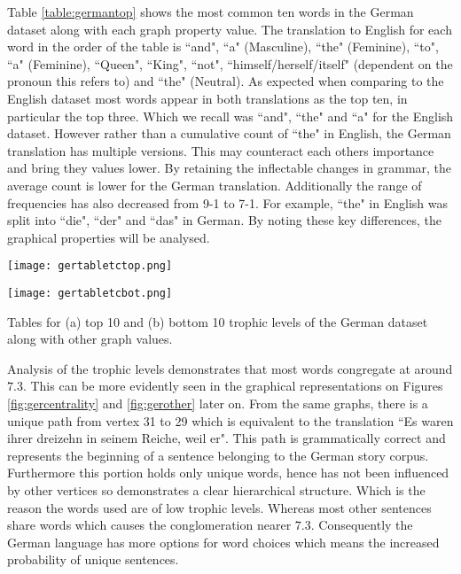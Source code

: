Table \ref{table:germantop} shows the most common ten words in the German dataset along with each graph property value. The translation to English for each word in the order of the table is ``and", ``a" (Masculine), ``the" (Feminine), ``to", ``a" (Feminine), ``Queen", ``King", ``not", ``himself/herself/itself" (dependent on the pronoun this refers to) and ``the" (Neutral). As expected when comparing to the English dataset most words appear in both translations as the top ten, in particular the top three. Which we recall was ``and", ``the" and ``a" for the English dataset. However rather than a cumulative count of ``the" in English, the German translation has multiple versions. This may counteract each others importance and bring they values lower. By retaining the inflectable changes in grammar, the average count is lower for the German translation. Additionally the range of frequencies has also decreased from 9-1 to 7-1. For example, ``the" in English was split into ``die", ``der" and ``das" in German. By noting these key differences, the graphical properties will be analysed.

\begin{table}[H]
\centering
\begin{subtable}{.45\textwidth}
	\centering
	\texttt{[image: gertabletctop.png]}
	\caption{}
	\label{table:germantoptc}
\end{subtable}
\hfill
\begin{subtable}{.45\textwidth}
	\centering
	\texttt{[image: gertabletcbot.png]}
	\caption{}
	\label{table:germanbottc}
\end{subtable}
\caption{Tables for (a) top 10 and (b) bottom 10 trophic levels of the German dataset along with other graph values.}
\end{table}

Analysis of the trophic levels demonstrates that most words congregate at around $7.3$. This can be more evidently seen in the graphical representations on Figures \ref{fig:gercentrality} and \ref{fig:gerother} later on. From the same graphs, there is a unique path from vertex 31 to 29 which is equivalent to the translation ``Es waren ihrer dreizehn in seinem Reiche, weil er". This path is grammatically correct and represents the beginning of a sentence belonging to the German story corpus. Furthermore this portion holds only unique words, hence has not been influenced by other vertices so demonstrates a clear hierarchical structure. Which is the reason the words used are of low trophic levels. Whereas most other sentences share words which causes the conglomeration nearer $7.3$. Consequently the German language has more options for word choices which means the increased probability of unique sentences.

